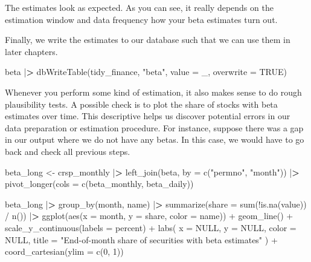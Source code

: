 \documentclass[
]{book}
\newenvironment{Shaded}{\begin{snugshade}}{\end{snugshade}}
\newcommand{\AttributeTok}[1]{\textcolor[rgb]{0.61,0.61,0.61}{#1}}
\newcommand{\ConstantTok}[1]{\textcolor[rgb]{0,0,0}{#1}}
\newcommand{\DecValTok}[1]{\textcolor[rgb]{0.06,0.06,0.06}{#1}}
\newcommand{\ErrorTok}[1]{\textcolor[rgb]{0.14,0.14,0.14}{\textbf{#1}}}
\newcommand{\FunctionTok}[1]{\textcolor[rgb]{0,0,0}{#1}}
\newcommand{\NormalTok}[1]{#1}
\newcommand{\OtherTok}[1]{\textcolor[rgb]{0.37,0.37,0.37}{#1}}
\newcommand{\SpecialCharTok}[1]{\textcolor[rgb]{0,0,0}{#1}}
\newcommand{\StringTok}[1]{\textcolor[rgb]{0.5,0.5,0.5}{#1}}
\begin{document}
The estimates look as expected. As you can see, it really depends on the estimation window and data frequency how your beta estimates turn out.

Finally, we write the estimates to our database such that we can use them in later chapters.

\begin{Shaded}
\begin{Highlighting}[]
\NormalTok{beta }\SpecialCharTok{|}\ErrorTok{\textgreater{}}
  \FunctionTok{dbWriteTable}\NormalTok{(tidy\_finance, }
               \StringTok{"beta"}\NormalTok{, }
               \AttributeTok{value =}\NormalTok{ \_, }
               \AttributeTok{overwrite =} \ConstantTok{TRUE}\NormalTok{)}
\end{Highlighting}
\end{Shaded}

Whenever you perform some kind of estimation, it also makes sense to do rough plausibility tests. A possible check is to plot the share of stocks with beta estimates over time.
This descriptive helps us discover potential errors in our data preparation or estimation procedure.
For instance, suppose there was a gap in our output where we do not have any betas.
In this case, we would have to go back and check all previous steps.

\begin{Shaded}
\begin{Highlighting}[]
\NormalTok{beta\_long }\OtherTok{\textless{}{-}}\NormalTok{ crsp\_monthly }\SpecialCharTok{|}\ErrorTok{\textgreater{}}
  \FunctionTok{left\_join}\NormalTok{(beta, }\AttributeTok{by =} \FunctionTok{c}\NormalTok{(}\StringTok{"permno"}\NormalTok{, }\StringTok{"month"}\NormalTok{)) }\SpecialCharTok{|}\ErrorTok{\textgreater{}}
  \FunctionTok{pivot\_longer}\NormalTok{(}\AttributeTok{cols =} \FunctionTok{c}\NormalTok{(beta\_monthly, beta\_daily))}

\NormalTok{beta\_long }\SpecialCharTok{|}\ErrorTok{\textgreater{}}
  \FunctionTok{group\_by}\NormalTok{(month, name) }\SpecialCharTok{|}\ErrorTok{\textgreater{}}
  \FunctionTok{summarize}\NormalTok{(}\AttributeTok{share =} \FunctionTok{sum}\NormalTok{(}\SpecialCharTok{!}\FunctionTok{is.na}\NormalTok{(value)) }\SpecialCharTok{/} \FunctionTok{n}\NormalTok{()) }\SpecialCharTok{|}\ErrorTok{\textgreater{}}
  \FunctionTok{ggplot}\NormalTok{(}\FunctionTok{aes}\NormalTok{(}\AttributeTok{x =}\NormalTok{ month, }\AttributeTok{y =}\NormalTok{ share, }\AttributeTok{color =}\NormalTok{ name)) }\SpecialCharTok{+}
  \FunctionTok{geom\_line}\NormalTok{() }\SpecialCharTok{+}
  \FunctionTok{scale\_y\_continuous}\NormalTok{(}\AttributeTok{labels =}\NormalTok{ percent) }\SpecialCharTok{+}
  \FunctionTok{labs}\NormalTok{(}
    \AttributeTok{x =} \ConstantTok{NULL}\NormalTok{, }\AttributeTok{y =} \ConstantTok{NULL}\NormalTok{, }\AttributeTok{color =} \ConstantTok{NULL}\NormalTok{,}
    \AttributeTok{title =} \StringTok{"End{-}of{-}month share of securities with beta estimates"}
\NormalTok{  ) }\SpecialCharTok{+}
  \FunctionTok{coord\_cartesian}\NormalTok{(}\AttributeTok{ylim =} \FunctionTok{c}\NormalTok{(}\DecValTok{0}\NormalTok{, }\DecValTok{1}\NormalTok{))}
\end{Highlighting}
\end{Shaded}
\end{document}
